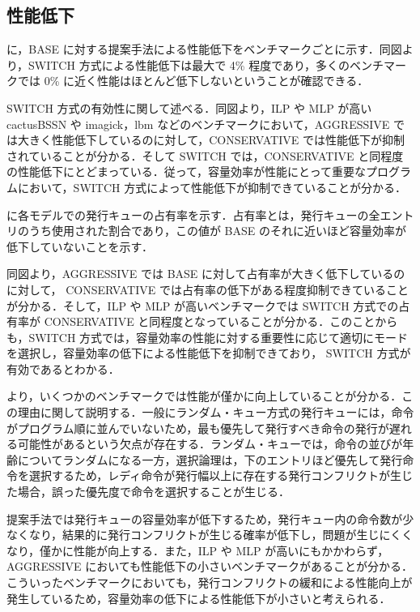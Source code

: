 \subsection{性能低下}
に，BASE に対する提案手法による性能低下をベンチマークごとに示す．同図より，SWITCH 方式による性能低下は最大で 4\% 程度であり，多くのベンチマークでは 0\% に近く性能はほとんど低下しないということが確認できる．

SWITCH 方式の有効性に関して述べる．同図より，ILP や MLP が高い cactusBSSN や imagick，lbm などのベンチマークにおいて，AGGRESSIVE では大きく性能低下しているのに対して，CONSERVATIVE では性能低下が抑制されていることが分かる．そして SWITCH では，CONSERVATIVE と同程度の性能低下にとどまっている．従って，容量効率が性能にとって重要なプログラムにおいて，SWITCH 方式によって性能低下が抑制できていることが分かる．

に各モデルでの発行キューの占有率を示す．占有率とは，発行キューの全エントリのうち使用された割合であり，この値が BASE のそれに近いほど容量効率が低下していないことを示す．

同図より，AGGRESSIVE では BASE に対して占有率が大きく低下しているのに対して， CONSERVATIVE では占有率の低下がある程度抑制できていることが分かる．そして，ILP や MLP が高いベンチマークでは SWITCH 方式での占有率が CONSERVATIVE と同程度となっていることが分かる．このことからも，SWITCH 方式では，容量効率の性能に対する重要性に応じて適切にモードを選択し，容量効率の低下による性能低下を抑制できており， SWITCH 方式が有効であるとわかる．

より，いくつかのベンチマークでは性能が僅かに向上していることが分かる．この理由に関して説明する．一般にランダム・キュー方式の発行キューには，命令がプログラム順に並んでいないため，最も優先して発行すべき命令の発行が遅れる可能性があるという欠点が存在する．ランダム・キューでは，命令の並びが年齢についてランダムになる一方，選択論理は，下のエントリほど優先して発行命令を選択するため，レディ命令が発行幅以上に存在する発行コンフリクトが生じた場合，誤った優先度で命令を選択することが生じる．

提案手法では発行キューの容量効率が低下するため，発行キュー内の命令数が少なくなり，結果的に発行コンフリクトが生じる確率が低下し，問題が生じにくくなり，僅かに性能が向上する．また，ILP や MLP が高いにもかかわらず，AGGRESSIVE においても性能低下の小さいベンチマークがあることが分かる．こういったベンチマークにおいても，発行コンフリクトの緩和による性能向上が発生しているため，容量効率の低下による性能低下が小さいと考えられる．

